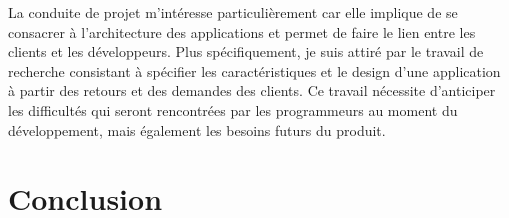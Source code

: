 \documentclass[11pt, oneside, titlepage, a4paper]{article}
\begin{document}
La conduite de projet m'intéresse particulièrement car elle implique de se consacrer à l'architecture des applications et permet de faire le lien entre les clients et les développeurs. Plus spécifiquement, je suis attiré par le travail de recherche consistant à spécifier les caractéristiques et le design d'une application à partir des retours et des demandes des clients. Ce travail nécessite d'anticiper les difficultés qui seront rencontrées par les programmeurs au moment du développement, mais également les besoins futurs du produit. 
\newpage
\section{Conclusion}
\end{document}
